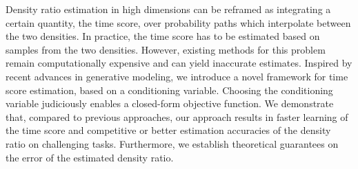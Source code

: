 Density ratio estimation in high dimensions can be reframed as integrating a certain quantity, the time score, over probability paths which interpolate between the two densities. In practice, the time score has to be estimated based on samples from the two densities. However, existing methods for this problem remain computationally expensive and can yield inaccurate estimates. Inspired by recent advances in generative modeling, we introduce a novel framework for time score estimation, based on a conditioning variable. Choosing the conditioning variable judiciously enables a closed-form objective function. We demonstrate that, compared to previous approaches, our approach results in faster learning of the time score and competitive or better estimation accuracies of the density ratio on challenging tasks. Furthermore, we establish theoretical guarantees on the error of the estimated density ratio.







